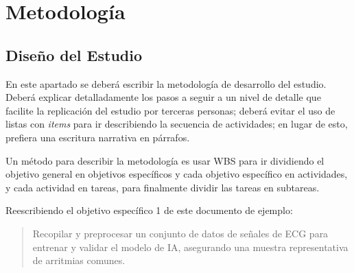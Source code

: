 \documentclass[12pt,letterpaper,spanish, twoside]{article}
\begin{document}
\section{Metodología}
\subsection{Diseño del Estudio}
En este apartado se deberá escribir la metodología de desarrollo del estudio. Deberá explicar detalladamente los pasos a seguir a un nivel de detalle que facilite la replicación del estudio por terceras personas; deberá evitar el uso de listas con \textit{items} para ir describiendo la secuencia de actividades; en lugar de esto, prefiera una escritura narrativa en párrafos.

Un método para describir la metodología es usar WBS para ir dividiendo el objetivo general en objetivos específicos y cada objetivo específico en actividades, y cada actividad en tareas, para finalmente dividir las tareas en subtareas.

Reescribiendo el objetivo específico 1 de este documento de ejemplo:
\begin{quote}
Recopilar y preprocesar un conjunto de datos de señales de ECG para entrenar y validar el modelo de IA, asegurando una muestra representativa de arritmias comunes.
\end{quote}
\end{document}
